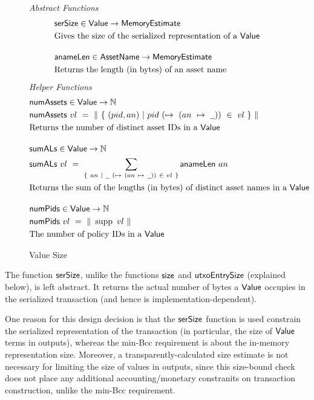 \begin{figure*}[h]
  \emph{Abstract Functions}
  \begin{align*}
    & \fun{serSize} \in \Value \to \MemoryEstimate \\
    & \text{Gives the size of the serialized representation of a $\Value$}
    \nextdef
    & \fun{anameLen} \in \AssetName \to \MemoryEstimate \\
    & \text{Returns the length (in bytes) of an asset name}
  \end{align*}
  \emph{Helper Functions}
  \begin{align*}
    & \fun{numAssets} \in \Value \to \N \\
    & \fun{numAssets}~{vl}~=~\|~\{~(pid, an)~\vert~pid~(\mapsto~(an~\mapsto~\wcard))~\in~vl~\}~\| \\
    & \text{Returns the number of distinct asset IDs in a $\Value$}
    & \nextdef
    & \fun{sumALs} \in \Value \to \N \\
    & \fun{sumALs}~{vl}~=~ \sum_{\{~an~\vert~\wcard~(\mapsto~(an~\mapsto~\wcard))~\in~vl~\}} \fun{anameLen}~an \\
    & \text{Returns the sum of the lengths (in bytes) of distinct asset names in a $\Value$}
    & \nextdef
    & \fun{numPids} \in \Value \to \N \\
    & \fun{numPids}~{vl} ~=~ \|~\supp~{vl}~\| \\
    & \text{The number of policy IDs in a $\Value$}
  \end{align*}
  \caption{Value Size}
  \label{fig:size-helper}
\end{figure*}

The function $\mathsf{serSize}$, unlike the functions $\mathsf{size}$ and $\mathsf{utxoEntrySize}$
    (explained below), is left abstract. It returns the actual number of bytes a $\mathsf{Value}$
    occupies in the serialized transaction (and hence is implementation-dependent).

    One reason for this design decision is that the $\mathsf{serSize}$ function is used constrain
    the serialized representation of the transaction (in particular, the size
    of $\mathsf{Value}$ terms in outputs), whereas the min-Bcc requirement is about
    the in-memory representation size. Moreover, a transparently-calculated size estimate
    is not necessary for limiting the size of values in outputs, since this size-bound
    check does not place any additional accounting/monetary constranits on transaction construction,
    unlike the min-Bcc requirement.

